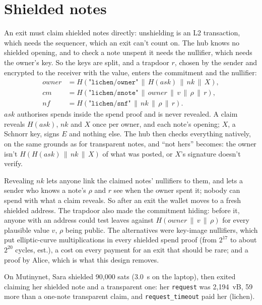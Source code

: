 \documentclass[11pt]{article}
\newcommand{\tx}[1]{\texttt{#1}}
\begin{document}
\section{Shielded notes}
\label{sec:shielded}

An exit must claim shielded notes directly: unshielding is an L2
transaction, which needs the sequencer, which an exit can't count on.
The hub knows no shielded opening, and to check a note unspent it needs
the nullifier, which needs the owner's key. So the keys are split, and a
trapdoor $r$, chosen by the sender and encrypted to the receiver with
the value, enters the commitment and the nullifier:
\begin{align*}
  \mathit{owner} &= H(\texttt{"lichen/owner"} \,\|\, H(\mathit{ask}) \,\|\, \mathit{nk} \,\|\, X),\\
  \mathit{cm} &= H(\texttt{"lichen/snote"} \,\|\, \mathit{owner} \,\|\, v \,\|\, \rho \,\|\, r),\\
  \mathit{nf} &= H(\texttt{"lichen/snf"} \,\|\, \mathit{nk} \,\|\, \rho \,\|\, r).
\end{align*}
$\mathit{ask}$ authorises spends inside the spend proof and is never
revealed. A claim reveals $H(\mathit{ask})$, $\mathit{nk}$ and $X$ once
per owner, and each note's opening; $X$, a Schnorr key, signs $E$ and
nothing else. The hub then checks everything natively, on the same
grounds as for transparent notes, and ``not hers'' becomes: the owner
isn't $H(H(\mathit{ask}) \,\|\, \mathit{nk} \,\|\, X)$ of what was
posted, or $X$'s signature doesn't verify.

Revealing $\mathit{nk}$ lets anyone link the claimed notes' nullifiers
to them, and lets a sender who knows a note's $\rho$ and $r$ see when
the owner spent it; nobody can spend with what a claim reveals. So
after an exit the wallet moves to a fresh shielded address. The
trapdoor also made the commitment hiding: before it, anyone with an
address could test leaves against $H(\mathit{owner} \,\|\, v \,\|\,
\rho)$ for every plausible value $v$, $\rho$ being public. The
alternatives were key-image nullifiers, which put elliptic-curve
multiplications in every shielded spend proof (from $2^{17}$ to about
$2^{20}$ cycles, est.), a cost on every payment for an exit that should
be rare; and a proof by Alice, which is what this design removes.

On Mutinynet, Sara shielded 90,000 sats (3.0~s on the laptop), then
exited claiming her shielded note and a transparent one: her
\tx{request} was 2,194~vB, 59 more than a one-note transparent claim,
and \tx{request\_timeout} paid her (lichen).
\end{document}

